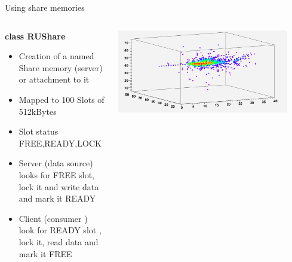 \begin{frame}{Using share memories}


  \begin{columns}
    \begin{column}{0.5\textwidth}
      {\bf class RUShare } 
      \begin{itemize}
      \item <1-> Creation of a named Share memory (server) or attachment to it
      \item <1-> Mapped to 100 Slots of 512kBytes
      \item <1-> Slot status FREE,READY,LOCK
      \item <2->Server (data source) looks for FREE slot, lock it and write data and mark it READY
      \item <2->Client (consumer ) look for READY slot , lock it, read data and mark it FREE
      \end{itemize}
    \end{column}
    \begin{column}{0.65\textwidth}
          {
            \centerline{\includegraphics[width=0.9\textwidth]{images/ShowerExample}}
          }
    \end{column}
  \end{columns}
\end{frame}

